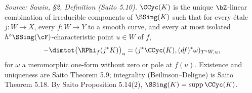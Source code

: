 \begin{definition}
  \label{def:sawin_characteristic_cycle}
  \textit{Source: Sawin, §2, Definition (Saito 5.10).}
  $\CCyc(K)$ is the unique $\bZ$-linear combination of irreducible components of
  $\SSing(K)$ such that for every étale $j:W\to X$, every $f:W\to Y$ to a smooth
  curve, and every at most isolated $h^\circ \SSing(\cF)$-characteristic point
  $u\in W$ of $f$,
  \[ -\dimtot\bigl(\RPhi_f(j^*K)\bigr)_u = (j^*\CCyc(K),(df)^*\omega)_{T^*W,u}, \]
  for $\omega$ a meromorphic one-form without zero or pole at $f(u)$.  Existence
  and uniqueness are Saito Theorem 5.9; integrality (Beilinson--Deligne) is Saito
  Theorem 5.18.  By Saito Proposition 5.14(2), $\SSing(K) = \operatorname{supp}\CCyc(K)$.
\end{definition}
